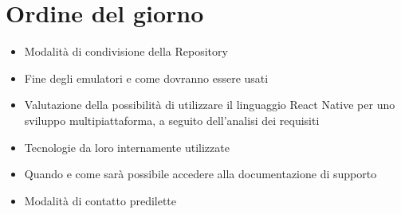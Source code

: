 \section{Ordine del giorno}
\begin{itemize}
    \item Modalità di condivisione della Repository
    \item Fine degli emulatori e come dovranno essere usati
    \item Valutazione della possibilità di utilizzare il
    linguaggio React Native per uno sviluppo
    multipiattaforma, a seguito dell'analisi dei requisiti
    \item Tecnologie da loro internamente utilizzate
    \item Quando e come sarà possibile
    accedere alla documentazione di supporto
    \item Modalità di contatto predilette
\end{itemize}
